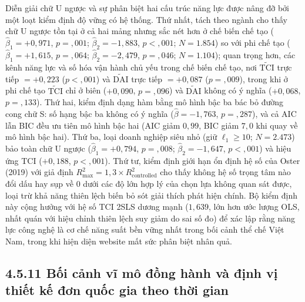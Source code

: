 \documentclass[
  a4paper,
  13pt]{extreport}
\begin{document}
Diễn giải chữ U ngược và sự phân biệt hai cấu trúc năng lực được nâng đỡ
bởi một loạt kiểm định độ vững có hệ thống. Thứ nhất, tách theo ngành
cho thấy chữ U ngược tồn tại ở cả hai mảng nhưng sắc nét hơn ở chế biến
chế tạo (\(\hat{\beta}_1 = +0{,}971\), \(p = {,}001\);
\(\hat{\beta}_2 = -1{,}883\), \(p < {,}001\); \(N = 1.854\)) so với phi
chế tạo (\(\hat{\beta}_1 = +1{,}615\), \(p = {,}064\);
\(\hat{\beta}_2 = -2{,}479\), \(p = {,}046\); \(N = 1.104\)); quan trọng
hơn, các kênh năng lực và số hóa vận hành chủ yếu trong chế biến chế
tạo, nơi \(\tilde{\mathrm{TCI}}\) trực tiếp \(= +0{,}223\)
(\(p < {,}001\)) và \(\tilde{\mathrm{DAI}}\) trực tiếp \(= +0{,}087\)
(\(p = {,}009\)), trong khi ở phi chế tạo \(\tilde{\mathrm{TCI}}\) chỉ ở
biên (\(+0{,}090\), \(p = {,}096\)) và \(\tilde{\mathrm{DAI}}\) không có
ý nghĩa (\(+0{,}068\), \(p = {,}133\)). Thứ hai, kiểm định dạng hàm bằng
mô hình bậc ba bác bỏ đường cong chữ S: số hạng bậc ba không có ý nghĩa
(\(\hat{\beta} = -1{,}763\), \(p = {,}287\)), và cả AIC lẫn BIC đều ưu
tiên mô hình bậc hai (AIC giảm \(0{,}99\), BIC giảm \(7{,}0\) khi quay
về mô hình bậc hai). Thứ ba, loại doanh nghiệp siêu nhỏ (giữ
\(\ell_1 \geq 10\); \(N = 2.473\)) bảo toàn chữ U ngược
(\(\hat{\beta}_1 = +0{,}794\), \(p = {,}008\);
\(\hat{\beta}_2 = -1{,}647\), \(p < {,}001\)) và hiệu ứng TCI
(\(+0{,}188\), \(p < {,}001\)). Thứ tư, kiểm định giới hạn ổn định hệ số
của Oster (2019) với giả định
\(R^2_{\max} = 1{,}3 \times R^2_{\text{controlled}}\) cho thấy không hệ
số trọng tâm nào đổi dấu hay sụp về 0 dưới các độ lớn hợp lý của chọn
lựa không quan sát được, loại trừ khả năng thiên lệch biến bỏ sót giải
thích phát hiện chính. Bộ kiểm định này cộng hưởng với hệ số TCI 2SLS
dương mạnh (\(1{,}639\), lớn hơn ước lượng OLS, nhất quán với hiệu chỉnh
thiên lệch suy giảm do sai số đo) để xác lập rằng năng lực công nghệ là
cơ chế năng suất bền vững nhất trong bối cảnh thể chế Việt Nam, trong
khi hiện diện website mất sức phân biệt nhân quả.

\hypertarget{bux1ed1i-cux1ea3nh-vux129-muxf4-ux111ux1ed3ng-huxe0nh-vuxe0-ux111ux1ecbnh-vux1ecb-thiux1ebft-kux1ebf-ux111ux1a1n-quux1ed1c-gia-theo-thux1eddi-gian}{%
\subsection{4.5.11 Bối cảnh vĩ mô đồng hành và định vị thiết kế đơn quốc
gia theo thời
gian}\label{bux1ed1i-cux1ea3nh-vux129-muxf4-ux111ux1ed3ng-huxe0nh-vuxe0-ux111ux1ecbnh-vux1ecb-thiux1ebft-kux1ebf-ux111ux1a1n-quux1ed1c-gia-theo-thux1eddi-gian}}
\end{document}
